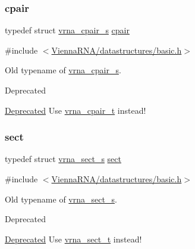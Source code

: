 \subsubsection{\texorpdfstring{cpair}{cpair}}
{\footnotesize\ttfamily typedef struct \mbox{\hyperlink{group__data__structures_structvrna__cpair__s}{vrna\+\_\+cpair\+\_\+s}} \mbox{\hyperlink{group__data__structures_ga8412f116a2eb07b59ade9e14ca7c5ef1}{cpair}}}



{\ttfamily \#include $<$\mbox{\hyperlink{datastructures_2basic_8h}{Vienna\+R\+N\+A/datastructures/basic.\+h}}$>$}



Old typename of \mbox{\hyperlink{group__data__structures_structvrna__cpair__s}{vrna\+\_\+cpair\+\_\+s}}. 

\begin{DoxyRefDesc}{Deprecated}
\item[\mbox{\hyperlink{deprecated__deprecated000214}{Deprecated}}]Use \mbox{\hyperlink{group__data__structures_gae4fc91141cc69c6d8eaf1332cb991ecc}{vrna\+\_\+cpair\+\_\+t}} instead! \end{DoxyRefDesc}
\mbox{\label{group__data__structures_gaaacedee1f05d3d45aa6764eca51a8876}} 
\subsubsection{\texorpdfstring{sect}{sect}}
{\footnotesize\ttfamily typedef struct \mbox{\hyperlink{group__data__structures_structvrna__sect__s}{vrna\+\_\+sect\+\_\+s}} \mbox{\hyperlink{group__data__structures_gaaacedee1f05d3d45aa6764eca51a8876}{sect}}}



{\ttfamily \#include $<$\mbox{\hyperlink{datastructures_2basic_8h}{Vienna\+R\+N\+A/datastructures/basic.\+h}}$>$}



Old typename of \mbox{\hyperlink{group__data__structures_structvrna__sect__s}{vrna\+\_\+sect\+\_\+s}}. 

\begin{DoxyRefDesc}{Deprecated}
\item[\mbox{\hyperlink{deprecated__deprecated000215}{Deprecated}}]Use \mbox{\hyperlink{group__data__structures_gacc9cdae790dac75a7024e7069c0d4400}{vrna\+\_\+sect\+\_\+t}} instead! \end{DoxyRefDesc}
\mbox{\label{group__data__structures_gaaeed53a7508c6ce549a98223e94b25df}} 
